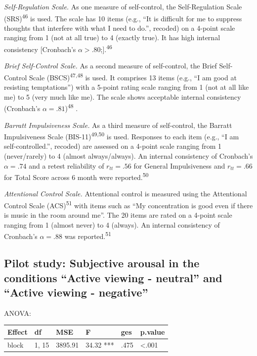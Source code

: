 \documentclass[
  english,
  man,floatsintext]{apa6}
\begin{document}
\emph{Self-Regulation Scale.}
As one measure of self-control, the Self-Regulation Scale (SRS)\textsuperscript{46} is used.
The scale has 10 items (e.g., ``It is difficult for me to suppress thoughts that interfere with what I need to do.'', recoded) on a 4-point scale ranging from 1 (not at all true) to 4 (exactly true).
It has high internal consistency {[}Cronbach's \(\alpha>.80\);{]}.\textsuperscript{46}

\emph{Brief Self-Control Scale.}
As a second measure of self-control, the Brief Self-Control Scale (BSCS)\textsuperscript{47,48} is used.
It comprises 13 items (e.g., ``I am good at resisting temptations'') with a 5-point rating scale ranging from 1 (not at all like me) to 5 (very much like me).
The scale shows acceptable internal consistency (Cronbach's \(\alpha=.81\))\textsuperscript{48} .

\emph{Barratt Impulsiveness Scale.}
As a third measure of self-control, the Barratt Impulsiveness Scale (BIS-11)\textsuperscript{49,50} is used.
Responses to each item (e.g., ``I am self-controlled.'', recoded) are assessed on a 4-point scale ranging from 1 (never/rarely) to 4 (almost always/always).
An internal consistency of Cronbach's \(\alpha=.74\) and a retest reliability of \(r_{tt}=.56\) for General Impulsiveness and \(r_{tt}=.66\) for Total Score across 6 month were reported.\textsuperscript{50}

\emph{Attentional Control Scale.}
Attentional control is measured using the Attentional Control Scale (ACS)\textsuperscript{51} with items such as ``My concentration is good even if there is music in the room around me''.
The 20 items are rated on a 4-point scale ranging from 1 (almost never) to 4 (always).
An internal consistency of Cronbach's \(\alpha=.88\) was reported.\textsuperscript{51}

\newpage

\hypertarget{pilot-study-subjective-arousal-in-the-conditions-active-viewing---neutral-and-active-viewing---negative}{%
\subsection{Pilot study: Subjective arousal in the conditions ``Active viewing - neutral'' and ``Active viewing - negative''}\label{pilot-study-subjective-arousal-in-the-conditions-active-viewing---neutral-and-active-viewing---negative}}

ANOVA:

\begin{tabular}{l|l|l|l|l|l}
\hline
Effect & df & MSE & F & ges & p.value\\
\hline
block & 1, 15 & 3895.91 & 34.32 *** & .475 & <.001\\
\hline
\end{tabular}
\end{document}
